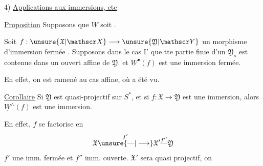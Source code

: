 4) \uline{Applications aux immersions, etc}

\uline{Proposition} Supposons que $\underline W$ soit  .

Soit $f:\unsure{\mathfrak X|\mathscr X}\longrightarrow\unsure{\mathfrak Y|\mathscr Y}$ un morphisme d'immersion  fermée . Supposons   dans le cas $\mathrm I'$ que  tte partie finie d'un $\mathfrak Y_s$ est contenue dans un ouvert affine de $\mathfrak Y$.  et $\underline W^{\bullet}(f)$  est une immersion fermée.

En effet, on est ramené au cas affine, où  a été vu.

\uline{Corollaire}  Si $\mathfrak Y$ est quasi-projectif sur $S^{*}$, et si $f:\mathfrak X\to\mathfrak Y$ est une immersion, alors $\underline W^\wedge(f)$ est une immersion.

En effet, $f$ se factorise en
\[
\mathfrak X\overset{f'}{\unsure{\text{---}|\longrightarrow}}
\mathfrak X'\overset{f''}{\text{---}}\mathfrak Y
\]
 $f'$ une imm. fermée et $f''$ imm. ouverte. $\mathfrak X'$ sera  quasi projectif, on
